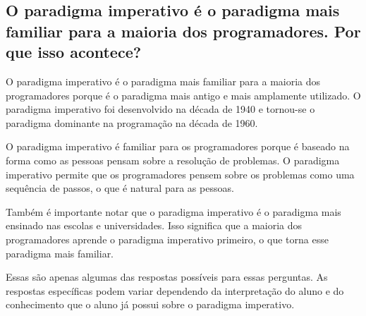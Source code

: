 \subsection{O paradigma imperativo é o paradigma mais familiar para a maioria dos programadores. Por que isso acontece?}

O paradigma imperativo é o paradigma mais familiar para a maioria dos programadores porque é o paradigma mais antigo e mais amplamente utilizado. O paradigma imperativo foi desenvolvido na década de 1940 e tornou-se o paradigma dominante na programação na década de 1960.

O paradigma imperativo é familiar para os programadores porque é baseado na forma como as pessoas pensam sobre a resolução de problemas. O paradigma imperativo permite que os programadores pensem sobre os problemas como uma sequência de passos, o que é natural para as pessoas.

Também é importante notar que o paradigma imperativo é o paradigma mais ensinado nas escolas e universidades. Isso significa que a maioria dos programadores aprende o paradigma imperativo primeiro, o que torna esse paradigma mais familiar.

Essas são apenas algumas das respostas possíveis para essas perguntas. As respostas específicas podem variar dependendo da interpretação do aluno e do conhecimento que o aluno já possui sobre o paradigma imperativo.
